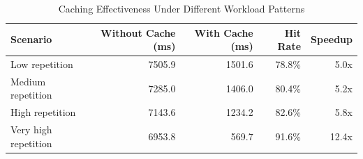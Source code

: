 
\begin{table}[h]
\centering
\caption{Caching Effectiveness Under Different Workload Patterns}
\label{tab:caching_benchmark}
\begin{tabular}{lrrrr}
\toprule
\textbf{Scenario} & \textbf{Without Cache (ms)} & \textbf{With Cache (ms)} & \textbf{Hit Rate} & \textbf{Speedup} \\
\midrule
Low repetition & 7505.9 & 1501.6 & 78.8\% & 5.0x \\
Medium repetition & 7285.0 & 1406.0 & 80.4\% & 5.2x \\
High repetition & 7143.6 & 1234.2 & 82.6\% & 5.8x \\
Very high repetition & 6953.8 & 569.7 & 91.6\% & 12.4x \\
\bottomrule
\end{tabular}
\end{table}
